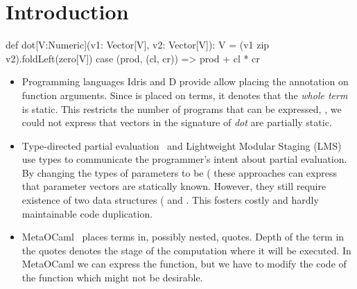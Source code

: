 \section{Introduction}
\label{sct:introduction}




\begin{lstparagraph}
  def dot[V:Numeric](v1: Vector[V], v2: Vector[V]): V =
    (v1 zip v2).foldLeft(zero[V]){ case (prod, (cl, cr)) =>
      prod + cl * cr
    }
 \end{lstparagraph}


\begin{itemize}
 \item Programming languages Idris and D provide allow placing the 
  annotation on function arguments. Since  is placed on terms, it
  denotes that the \emph{whole term} is static. This restricts the number of programs
  that can be expressed, \eg, we could not express that vectors in the signature of \emph{dot}
  are partially static.

 \item Type-directed partial evaluation~\cite{danvy1999type} and
  Lightweight Modular Staging (LMS)~\cite{rompf2012lightweight} use types to communicate
  the programmer's intent about partial evaluation. By changing the types of parameters
  to be (\eg {} these approaches can express that parameter vectors
  are statically known. However, they still require existence of two data structures
  (\eg {} and . This fosters costly and hardly maintainable
  code duplication.

 \item MetaOCaml~\cite{taha_multi-stage_1997} places terms in, possibly nested,
   quotes. Depth of the term in the quotes denotes the stage of the computation
   where it will be executed. In MetaOCaml we can express the  function,
   but we have to modify the code of the  function which might not be desirable.

\end{itemize}

